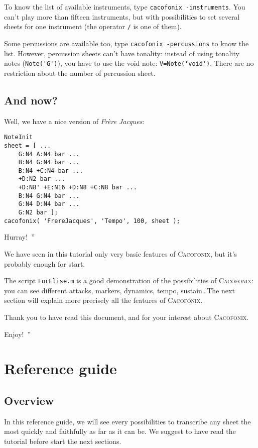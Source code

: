 \documentclass{article}
\newcommand{\cacofonix}{\textsc{Cacofonix}\xspace}
\newcommand{\frerejaques}{\emph{Fr\`ere Jacques}\xspace}
\newcommand{\file}[1]{\texttt{#1}\xspace}
\newenvironment{meenv}{ \par \noindent \makebox[6em][r]{ \textcolor{mecolor}{Me}: `` --~}}{~''}
\newenvironment{myselfenv}{ \par \noindent \makebox[6em][r]{ \textcolor{myselfcolor}{Myself}: `` --~}}{~''}
\newcommand{\me}[1]{\begin{meenv}#1\end{meenv}}
\newcommand{\myself}[1]{\begin{myselfenv}#1\end{myselfenv}}
\begin{document}
To know the list of available instruments, type \lstinline!cacofonix -instruments!. You can't play more than fifteen instruments, but with possibilities to set several sheets for one instrument (the operator \lstinline!/! is one of them).

Some percussions are available too, type \lstinline!cacofonix -percussions! to know the list. However, percussion sheets can't have tonality: instead of using tonality notes (\lstinline!Note('G')!), you have to use the void note: \lstinline!V=Note('void')!. There are no restriction about the number of percussion sheet.

\subsection{And now?}

Well, we have a nice version of \frerejaques:
\begin{lstlisting}
NoteInit
sheet = [ ...
	G:N4 A:N4 bar ...
	B:N4 G:N4 bar ...
	B:N4 +C:N4 bar ...
	+D:N2 bar ...
	+D:N8' +E:N16 +D:N8 +C:N8 bar ...
	B:N4 G:N4 bar ...
	G:N4 D:N4 bar ...
	G:N2 bar ];
cacofonix( 'FrereJacques', 'Tempo', 100, sheet );
\end{lstlisting}

\me{Hurray!}

We have seen in this tutorial only very basic features of \cacofonix, but it's probably enough for start.

The script \file{ForElise.m} is a good demonstration of the possibilities of \cacofonix: you can see different attacks, markers, dynamics, tempo, sustain\dots The next section will explain more precisely all the features of \cacofonix.

Thank you to have read this document, and for your interest about \cacofonix.

\myself{Enjoy!}

\section{Reference guide}

\subsection{Overview}

In this reference guide, we will see every possibilities to transcribe any sheet the most quickly and faithfully as far as it can be. We suggest to have read the tutorial before start the next sections.
\end{document}

